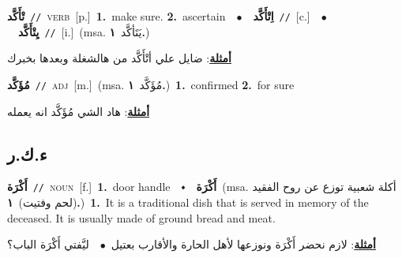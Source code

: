 \documentclass[10pt,a4paper,twoside]{article} %
\begin{document}
\begin{multicols}{2}
{\setlength\topsep{0pt}\textbf{\foreignlanguage{arabic}{تْأَكَّد}}\ {\color{gray}\texttt{//}\color{black}}\ \textsc{verb}\ [p.]\ \textbf{1.}~make sure.  \textbf{2.}~ascertain\ \ $\bullet$\ \ \setlength\topsep{0pt}\textbf{\foreignlanguage{arabic}{اِتْأَكَّد}}\ {\color{gray}\texttt{//}\color{black}}\ [c.]\ \ $\bullet$\ \ \setlength\topsep{0pt}\textbf{\foreignlanguage{arabic}{يِتْأَكَّد}}\ {\color{gray}\texttt{//}\color{black}}\ [i.]\ \color{gray}(msa. \foreignlanguage{arabic}{يَتَأكَّد}~\foreignlanguage{arabic}{\textbf{١.}})\color{black}\  \begin{flushright}\color{gray}\foreignlanguage{arabic}{\textbf{\underline{\foreignlanguage{arabic}{أمثلة}}}: ضايل علي أتْأَكَّد من هالشغلة وبعدها بخبرك}\end{flushright}\color{black}} \vspace{2mm}

{\setlength\topsep{0pt}\textbf{\foreignlanguage{arabic}{مُؤَكَّد}}\ {\color{gray}\texttt{//}\color{black}}\ \textsc{adj}\ [m.]\ \color{gray}(msa. \foreignlanguage{arabic}{مُؤَكَّد}~\foreignlanguage{arabic}{\textbf{١.}})\color{black}\ \textbf{1.}~confirmed  \textbf{2.}~for sure\  \begin{flushright}\color{gray}\foreignlanguage{arabic}{\textbf{\underline{\foreignlanguage{arabic}{أمثلة}}}: هاد الشي مُؤَكَّد انه يعمله}\end{flushright}\color{black}} \vspace{2mm}

\vspace{-3mm}
\subsection*{\color{blue}\foreignlanguage{arabic}{ء.ك.ر}\color{blue}{ (ntws)}} 

{\setlength\topsep{0pt}\textbf{\foreignlanguage{arabic}{أَكْرَة}}\ {\color{gray}\texttt{//}\color{black}}\ \textsc{noun}\ [f.]\ \textbf{1.}~door handle\ \ $\smblkdiamond$\ \ \setlength\topsep{0pt}\textbf{\foreignlanguage{arabic}{أَكْرَة}}\ \color{gray}(msa. \foreignlanguage{arabic}{أكلة شعبية توزع عن روح الفقيد (لحم وفتيت)}~\foreignlanguage{arabic}{\textbf{١.}})\color{black}\ \textbf{1.}~It is a traditional dish that is served in memory of the deceased. It is usually made of ground bread and meat.\  \begin{flushright}\color{gray}\foreignlanguage{arabic}{\textbf{\underline{\foreignlanguage{arabic}{أمثلة}}}: لازم نحضر أَكْرَة ونوزعها لأهل الحارة والأقارب بعتيل\ $\bullet$\ \  ليَّفتي أَكْرَة الباب؟}\end{flushright}\color{black}} \vspace{2mm}


\end{multicols}
\end{document}

